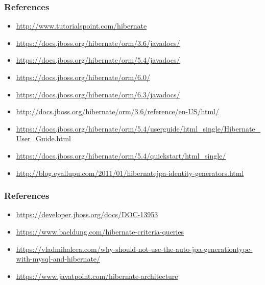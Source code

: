 \documentclass[10pt,xcolor=pdflatex]{beamer}
\begin{document}
\begin{frame}\frametitle{References}
	\begin{itemize}
		\item \url{http://www.tutorialspoint.com/hibernate}
		\item \url{https://docs.jboss.org/hibernate/orm/3.6/javadocs/}
        \item \url{https://docs.jboss.org/hibernate/orm/5.4/javadocs/}
        \item \url{https://docs.jboss.org/hibernate/orm/6.0/}
        \item \url{https://docs.jboss.org/hibernate/orm/6.3/javadocs/}
        \item \url{http://docs.jboss.org/hibernate/orm/3.6/reference/en-US/html/}
        \item \url{https://docs.jboss.org/hibernate/orm/5.4/userguide/html_single/Hibernate_User_Guide.html}
        \item \url{https://docs.jboss.org/hibernate/orm/5.4/quickstart/html_single/}
        \item \url{http://blog.eyallupu.com/2011/01/hibernatejpa-identity-generators.html}
	\end{itemize}
\end{frame}

\begin{frame}\frametitle{References}
	\begin{itemize}
        \item \url{https://developer.jboss.org/docs/DOC-13953}
        \item \url{https://www.baeldung.com/hibernate-criteria-queries}
        \item \url{https://vladmihalcea.com/why-should-not-use-the-auto-jpa-generationtype-with-mysql-and-hibernate/}
        \item \url{https://www.javatpoint.com/hibernate-architecture}
	\end{itemize}
\end{frame}


\end{document}
